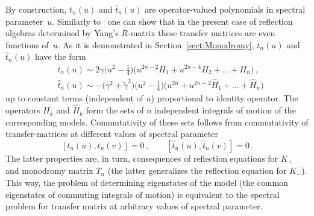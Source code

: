 \documentclass[a4paper,11pt]{article}
\numberwithin{equation}{section}
\begin{document}
By construction, $t_n(u)$ and $\hat{t}_n(u)$ are operator-valued polynomials in spectral parameter~$u$.
Similarly to~\cite[Section~4]{Skl:Boundary} one can show that in the present case of reflection algebras determined by Yang's $R$-matrix these transfer matrices are even functions of~$u$.
As it is demonstrated in Section~\ref{sect:Monodromy}, $t_n(u)$ and $\hat{t}_n(u)$ have the form
\begin{align}
	& \nonumber
	t_n(u) \sim
	2\gamma\bigl(u^2-\frac{1}{4}\bigr)\biggl(u^{2n-2}H_1+u^{2n-4}H_2+\ldots+H_n\biggr) \,,\\
	& \label{t_expl_int}
	\hat{t}_n(u) \sim
	-\bigl(\gamma^2+\tilde{\gamma}^2\bigr)\bigl(u^2-\frac{1}{4}\bigr)\biggl(u^{2n}+u^{2n-2}\hat{H}_1+\ldots+\hat{H}_n\biggr)
\end{align}
up to constant terms (independent of $u$) proportional to identity operator.
The operators $H_k$ and $\hat{H}_k$ form the sets of $n$ independent integrals of motion of the corresponding models.
Commutativity of these sets follows from commutativity of transfer-matrices at different values of spectral parameter
\begin{equation} \nonumber
	[t_n(u), t_n(v)] = 0 \,, \qquad [\hat{t}_n(u),\hat{t}_n(v)] = 0 \,.
\end{equation}
The latter properties are, in turn, consequences of reflection equations for $K_+$ and monodromy matrix $T_n$ (the latter generalizes the reflection equation for $K_-$).
This way, the problem of determining eigenstates of the model (the common eigenstates of commuting integrals of motion) is equivalent to the spectral problem for transfer matrix at arbitrary values of spectral parameter.
\end{document}
